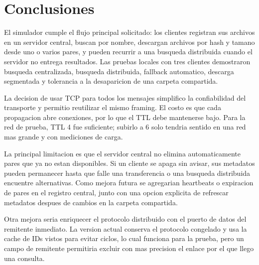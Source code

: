 \section{Conclusiones}

El simulador cumple el flujo principal solicitado: los clientes registran sus
archivos en un servidor central, buscan por nombre, descargan archivos por
hash y tamano desde uno o varios pares, y pueden recurrir a una busqueda
distribuida cuando el servidor no entrega resultados. Las pruebas locales con
tres clientes demostraron busqueda centralizada, busqueda distribuida,
fallback automatico, descarga segmentada y tolerancia a la desaparicion de una
carpeta compartida.

La decision de usar TCP para todos los mensajes simplifico la confiabilidad del
transporte y permitio reutilizar el mismo framing. El costo es que cada
propagacion abre conexiones, por lo que el TTL debe mantenerse bajo. Para la
red de prueba, TTL 4 fue suficiente; subirlo a 6 solo tendria sentido en una
red mas grande y con mediciones de carga.

La principal limitacion es que el servidor central no elimina automaticamente
pares que ya no estan disponibles. Si un cliente se apaga sin avisar, sus
metadatos pueden permanecer hasta que falle una transferencia o una busqueda
distribuida encuentre alternativas. Como mejora futura se agregarian heartbeats
o expiracion de pares en el registro central, junto con una opcion explicita de
refrescar metadatos despues de cambios en la carpeta compartida.

Otra mejora seria enriquecer el protocolo distribuido con el puerto de datos
del remitente inmediato. La version actual conserva el protocolo congelado y
usa la cache de IDs vistos para evitar ciclos, lo cual funciona para la prueba,
pero un campo de remitente permitiria excluir con mas precision el enlace por
el que llego una consulta.
